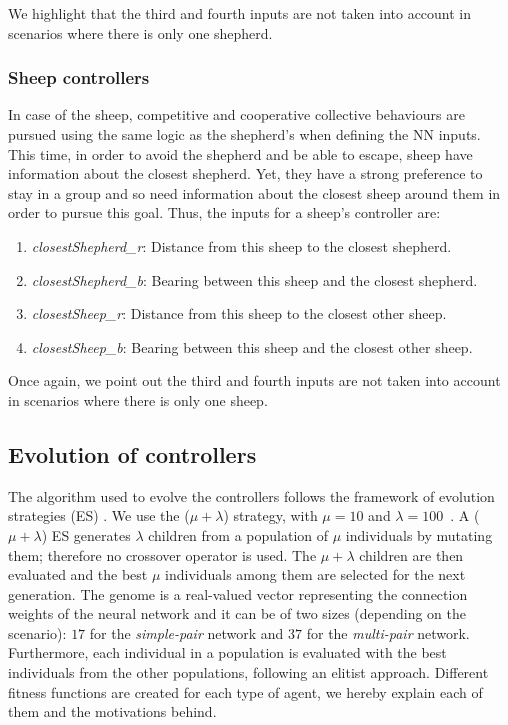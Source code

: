 \documentclass[conference]{IEEEtran}
\begin{document}
We highlight that the third and fourth inputs are not taken into account in scenarios where there is only one shepherd. 

\vspace{0.5em}
\subsubsection{Sheep controllers}
In case of the sheep, competitive and cooperative collective behaviours are pursued using the same logic as the shepherd's when defining the NN inputs. 
This time, in order to avoid the shepherd and be able to escape, sheep have information about the closest shepherd. 
Yet, they have a strong preference to stay in a group and so need information about the closest sheep around them in order to pursue this goal. 
Thus, the inputs for a sheep's controller are:

\begin{enumerate}
	\item \textit{closestShepherd\_r}: Distance from this sheep to the closest shepherd.
	\item \textit{closestShepherd\_b}: Bearing between this sheep and the closest shepherd.
	\item \textit{closestSheep\_r}: Distance from this sheep to the closest other sheep.
	\item \textit{closestSheep\_b}: Bearing between this sheep and the closest other sheep.
\end{enumerate}

Once again, we point out the third and fourth inputs are not taken into account in scenarios where there is only one sheep. 

\subsection{Evolution of controllers}
\label{sec:controllers_evolution}
The algorithm used to evolve the controllers follows the framework of evolution strategies (ES) \cite{back1993overview}. 
We use the ($\mu + \lambda$) strategy, with $\mu = 10$ and $\lambda = 100$~\cite{eiben2003introduction}. 
A ($\mu + \lambda$) ES generates $\lambda$ children from a population of $\mu$ individuals by mutating them; therefore no crossover operator is used.
The $\mu + \lambda$ children are then evaluated and the best $\mu$ individuals among them are selected for the next generation.
The genome is a real-valued vector representing the connection weights of the neural network and it can be of two sizes (depending on the scenario): $17$ for the \textit{simple-pair} network and $37$ for the \textit{multi-pair} network. 
Furthermore, each individual in a population is evaluated with the best individuals from the other populations, following an elitist approach.
Different fitness functions are created for each type of agent, we hereby explain each of them and the motivations behind.
\end{document}
